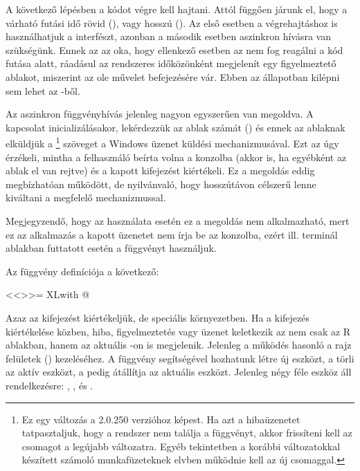 A következő lépésben a kódot végre kell hajtani. Attól függően járunk
el, hogy a várható 
futási idő rövid (), vagy hosszú (). Az első esetben a
végrehajtáshoz is használhatjuk a  interfészt, azonban a
második esetben aszinkron hívásra van szükségünk. Ennek az az oka,
hogy ellenkező esetben az  nem fog reagálni 
a kód futása alatt, ráadásul az  rendszeres időközönként
megjelenít egy figyelmeztető
ablakot, miszerint az  ole művelet befejezésére vár. 
Ebben az állapotban kilépni sem
lehet az -ből.


Az aszinkron függvényhívás jelenleg nagyon egyszerűen van megoldva. A
kapcsolat inicializálásakor, lekérdezzük az  ablak számát
() és ennek az ablaknak elküldjük a
\footnote{Ez egy változás a 2.0.250
  verzióhoz képest. Ha azt a hibaüzenetet tatpasztaljuk, hogy a
  rendszer nem találja a   függvényt, akkor
  frissíteni kell az  csomagot a legújabb változatra. Egyéb
tekintetben a korábbi változatokkal készített számoló munkafüzeteknek
elvben működnie kell az új  csomaggal.} szöveget a Windows
üzenet küldési mechanizmusával. Ezt 
az  úgy érzékeli, mintha a felhasználó beírta volna a konzolba
(akkor is, ha egyébként az  ablak el van rejtve) és a kapott
kifejezést kiértékeli. Ez a megoldás eddig megbízhatóan működött, de
nyilvánvaló, hogy hosszútávon célszerű lenne kiváltani a megfelelő
 mechanizmussal.  

Megjegyzendő, hogy az
használata esetén ez a megoldás nem alkalmazható, mert ez az
alkalmazás a kapott üzenetet 
nem írja be az  konzolba, ezért  ill. terminál
ablakban futtatott  esetén a  
függvényt használjuk.

Az  függvény definíciója a következő:
\begin{Rnw}
<<>>=
XLwith
@ 
\end{Rnw}
Azaz az   kifejezést kiértékeljük, de speciális
környezetben. Ha a kifejezés kiértékelése közben, hiba, figyelmeztetés
vagy üzenet keletkezik az nem csak az R ablakban, hanem 
az aktuális -on is megjelenik. Jelenleg a működés
hasonló a rajz felületek () kezeléséhez. A
 függvény segítségével hozhatunk létre új eszközt, a 
 törli az aktív eszközt, a  pedig
átállítja az aktuális eszközt. Jelenleg 
négy féle eszköz áll rendelkezésre: , ,
 és .


